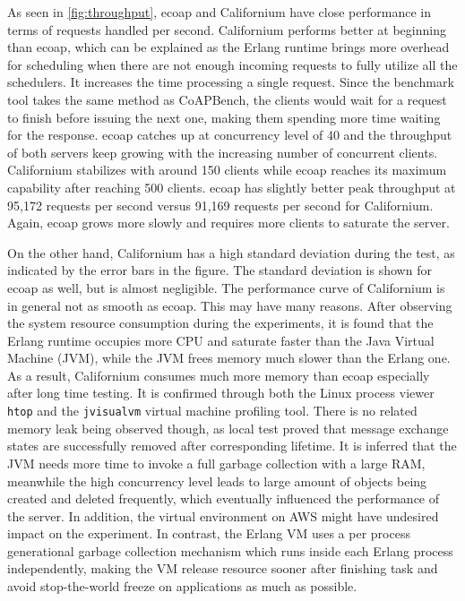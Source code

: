 As seen in \autoref{fig:throughput}, ecoap and Californium have close performance in terms of requests handled per second. Californium performs better at beginning than ecoap, which can be explained as the Erlang runtime brings more overhead for scheduling when there are not enough incoming requests to fully utilize all the schedulers. It increases the time processing a single request. Since the benchmark tool takes the same method as CoAPBench, the clients would wait for a request to finish before issuing the next one, making them spending more time waiting for the response. ecoap catches up at concurrency level of 40 and the throughput of both servers keep growing with the increasing number of concurrent clients. Californium stabilizes with around 150 clients while ecoap reaches its maximum capability after reaching 500 clients. ecoap has slightly better peak throughput at 95,172 requests per second versus 91,169 requests per second for Californium. Again, ecoap grows more slowly and requires more clients to saturate the server.

On the other hand, Californium has a high standard deviation during the test, as indicated by the error bars in the figure. The standard deviation is shown for ecoap as well, but is almost negligible. The performance curve of Californium is in general not as smooth as ecoap.
This may have many reasons. After observing the system resource consumption during the experiments, it is found that the Erlang runtime occupies more CPU and saturate faster than the Java Virtual Machine (JVM), while the JVM frees memory much slower than the Erlang one. As a result, Californium consumes much more memory than ecoap especially after long time testing. It is confirmed through both the Linux process viewer \verb|htop| and the \verb|jvisualvm| \autocite{jvisualvm} virtual machine profiling tool. There is no related memory leak being observed though, as local test proved that message exchange states are successfully removed after corresponding lifetime. It is inferred that the JVM needs more time to invoke a full garbage collection with a large RAM, meanwhile the high concurrency level leads to large amount of objects being created and deleted frequently, which eventually influenced the performance of the server. In addition, the virtual environment on AWS might have undesired impact on the experiment. In contrast, the Erlang VM uses a per process generational garbage collection mechanism which runs inside each Erlang process independently, making the VM release resource sooner after finishing task and avoid stop-the-world freeze on applications as much as possible. 

